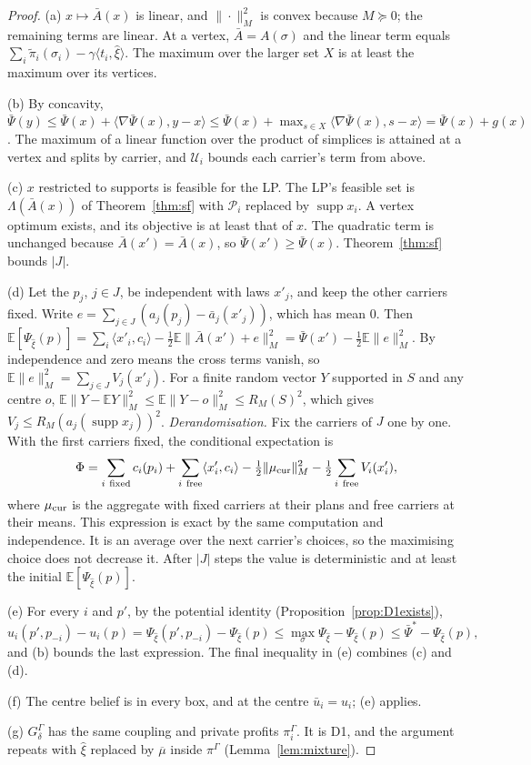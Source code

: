 \documentclass[11pt]{article}
\theoremstyle{definition}
\theoremstyle{remark}
\newcommand{\E}{\mathbb{E}}
\newcommand{\cP}{\mathcal{P}}
\newcommand{\ub}{\bar u}
\newcommand{\abar}{\bar a}
\newcommand{\Abar}{\bar A}
\newcommand{\supp}{\operatorname{supp}}
\begin{document}
\begin{proof}
(a) $x\mapsto\Abar(x)$ is linear, and $\|\cdot\|_M^2$ is convex because $M\succeq0$; the remaining terms are linear. At a vertex, $\Abar=A(\sigma)$ and the linear term equals $\sum_i\tilde\pi_i(\sigma_i)-\gamma\langle t_i,\hat\xi\rangle$. The maximum over the larger set $X$ is at least the maximum over its vertices.

(b) By concavity, $\bar\Psi(y)\le\bar\Psi(x)+\langle\nabla\bar\Psi(x),y-x\rangle\le\bar\Psi(x)+\max_{s\in X}\langle\nabla\bar\Psi(x),s-x\rangle=\bar\Psi(x)+g(x)$. The maximum of a linear function over the product of simplices is attained at a vertex and splits by carrier, and $\mathcal U_i$ bounds each carrier's term from above.

(c) $x$ restricted to supports is feasible for the LP. The LP's feasible set is $\Lambda(\Abar(x))$ of Theorem~\ref{thm:sf} with $\cP_i$ replaced by $\supp x_i$. A vertex optimum exists, and its objective is at least that of $x$. The quadratic term is unchanged because $\Abar(x')=\Abar(x)$, so $\bar\Psi(x')\ge\bar\Psi(x)$. Theorem~\ref{thm:sf} bounds $|J|$.

(d) Let the $p_j$, $j\in J$, be independent with laws $x'_j$, and keep the other carriers fixed. Write $e=\sum_{j\in J}(a_j(p_j)-\abar_j(x'_j))$, which has mean $0$. Then
$\E[\Psi_{\hat\xi}(p)]=\sum_i\langle x'_i,c_i\rangle-\tfrac12\E\|\Abar(x')+e\|_M^2=\bar\Psi(x')-\tfrac12\E\|e\|_M^2$. By independence and zero means the cross terms vanish, so $\E\|e\|_M^2=\sum_{j\in J}V_j(x'_j)$. For a finite random vector $Y$ supported in $S$ and any centre $o$, $\E\|Y-\E Y\|_M^2\le\E\|Y-o\|_M^2\le R_M(S)^2$, which gives $V_j\le R_M(a_j(\supp x_j))^2$. \emph{Derandomisation.} Fix the carriers of $J$ one by one. With the first carriers fixed, the conditional expectation is
\begin{equation}\label{eq:condexp}
\Phi=\sum_{i\ \rm fixed}c_i(p_i)+\sum_{i\ \rm free}\langle x'_i,c_i\rangle-\tfrac12\|\mu_{\rm cur}\|_M^2-\tfrac12\sum_{i\ \rm free}V_i(x'_i),
\end{equation}
where $\mu_{\rm cur}$ is the aggregate with fixed carriers at their plans and free carriers at their means. This expression is exact by the same computation and independence. It is an average over the next carrier's choices, so the maximising choice does not decrease it. After $|J|$ steps the value is deterministic and at least the initial $\E[\Psi_{\hat\xi}(p)]$.

(e) For every $i$ and $p'$, by the potential identity (Proposition~\ref{prop:D1exists}),
\[u_i(p',p_{-i})-u_i(p)=\Psi_{\hat\xi}(p',p_{-i})-\Psi_{\hat\xi}(p)\le\max_\sigma\Psi_{\hat\xi}-\Psi_{\hat\xi}(p)\le\bar\Psi^*-\Psi_{\hat\xi}(p),\]
and (b) bounds the last expression. The final inequality in (e) combines (c) and (d).

(f) The centre belief is in every box, and at the centre $\ub_i=u_i$; (e) applies.

(g) $G^\Gamma_\delta$ has the same coupling and private profits $\pi^\Gamma_i$. It is D1, and the argument repeats with $\hat\xi$ replaced by $\overline\mu$ inside $\pi^\Gamma$ (Lemma~\ref{lem:mixture}).
\end{proof}
\end{document}
